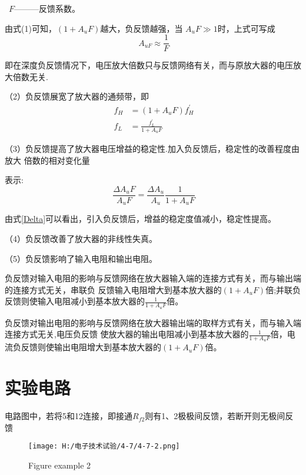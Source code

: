 \documentclass{article}
\begin{document}
			  \, \qquad $F$———反馈系数。\par
			   由式(1)可知，$(1+A_{u}F)$越大，负反馈越强，当 $A_{u}F\gg1$时，上式可写成
               \begin{equation}
                \ A_{uF}\approx \frac{1}{F}
               \end{equation}
               \par
        	   即在深度负反馈情况下，电压放大倍数只与反馈网络有关，而与原放大器的电压放大倍数无关.\par
			   （2）负反馈展宽了放大器的通频带，即
               \begin{align}
                \ f_H&=(1+A_{u}F)f_H^{'} \\
                \ f_L&=\frac{f_L^{'}}{1+A_{u}F}
               \end{align}   
               \par     
               （3）负反馈提高了放大器电压增益的稳定性.加入负反馈后，稳定性的改善程度由放大
               倍数的相对变化量\par 表示:
               \begin{equation}\label{Delta}
                \ \frac{\varDelta A_{u}F}{A_{u}F}=\frac{\varDelta A_{u}}{A_u}\frac{1}{1+A_{u}F}
               \end{equation}
             
                由式\eqref{Delta}可以看出，引入负反馈后，增益的稳定度值减小，稳定性提高。\par
                （4）负反馈改善了放大器的非线性失真。\par
                （5）负反馈影响了输入电阻和输出电阻。\par
              负反馈对输入电阻的影响与反馈网络在放大器输入端的连接方式有关，而与输出端的连接方式无关，串联负
              反馈输入电阻增大到基本放大器的$(1+A_{u}F)$倍;并联负反馈则使输入电阻减小到基本放大器的$\frac{1}{1+A_{u}F}$倍。\par
              负反馈对输出电阻的影响与反馈网络在放大器输出端的取样方式有关，而与输入端连接方式无关,电压负反馈
              使放大器的输出电阻减小到基本放大器的$\frac{1}{1+A_{u}F}$倍，电流负反馈则使输出电阻增大到基本放大器的$(1+A_{u}F)$倍。\par

\section{ 实验电路}
电路图中，若将5和12连接，即接通$R_{f2}$则有1、2极极间反馈，若断开则无极间反馈\par
\begin{figure}[h]
	\centering
	\texttt{[image: H:/电子技术试验/4-7/4-7-2.png]}
	\caption{Figure example 2} \label{fig:aa}
\end{figure}
\end{document}
